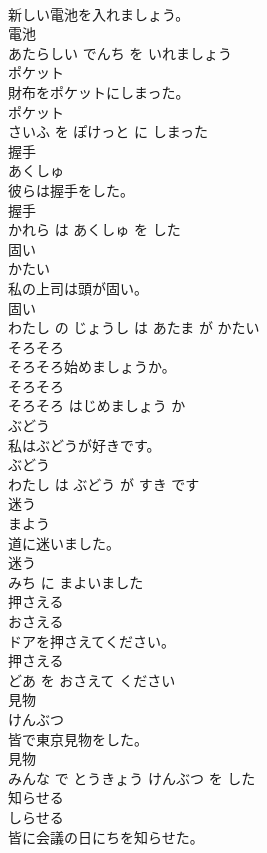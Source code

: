 \documentclass[8pt]{extreport}
\begin{document}
\begin{CJK}{UTF8}{min}
\\	新しい電池を入れましょう。	
\\	電池 
\\	あたらしい でんち を いれましょう			
\\	ポケット	
\\	財布をポケットにしまった。	
\\	ポケット 
\\	さいふ を ぽけっと に しまった			
\\	握手	
\\	あくしゅ			
\\	彼らは握手をした。	
\\	握手 
\\	かれら は あくしゅ を した			
\\	固い	
\\	かたい			
\\	私の上司は頭が固い。	
\\	固い 
\\	わたし の じょうし は あたま が かたい			
\\	そろそろ	
\\	そろそろ始めましょうか。	
\\	そろそろ 
\\	そろそろ はじめましょう か			
\\	ぶどう	
\\	私はぶどうが好きです。	
\\	ぶどう 
\\	わたし は ぶどう が すき です			
\\	迷う	
\\	まよう			
\\	道に迷いました。	
\\	迷う 
\\	みち に まよいました			
\\	押さえる	
\\	おさえる			
\\	ドアを押さえてください。	
\\	押さえる 
\\	どあ を おさえて ください			
\\	見物	
\\	けんぶつ			
\\	皆で東京見物をした。	
\\	見物 
\\	みんな で とうきょう けんぶつ を した			
\\	知らせる	
\\	しらせる			
\\	皆に会議の日にちを知らせた。	

\end{CJK}
\end{document}
